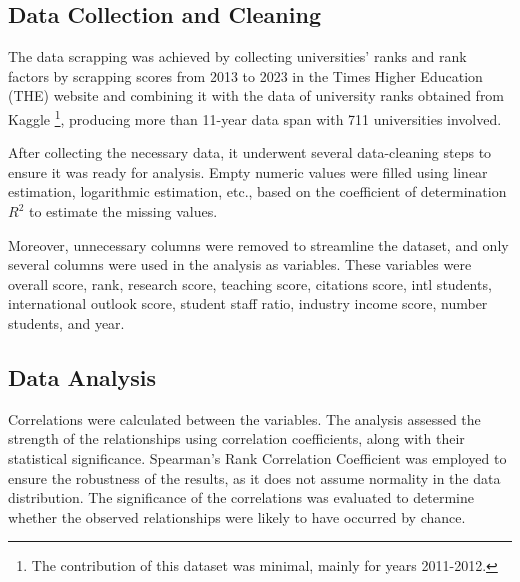 \documentclass[conference]{IEEEtran}
\begin{document}
\subsection{Data Collection and Cleaning}

The data scrapping was achieved by collecting universities' ranks and rank factors by scrapping scores from 2013 to 2023 in the Times Higher Education (THE) website \cite{the2024} and combining it with the data of university ranks obtained from Kaggle \cite{ONeil_2020}\footnote{The contribution of this dataset was minimal, mainly for years 2011-2012.}, producing more than 11-year data span with 711 universities involved. 

After collecting the necessary data, it underwent several data-cleaning steps to ensure it was ready for analysis. Empty numeric values were filled using linear estimation, logarithmic estimation, etc., based on the coefficient of determination $R^{2}$ to estimate the missing values. 

Moreover, unnecessary columns were removed to streamline the dataset, and only several columns were used in the analysis as variables. These variables were overall score, rank, research score, teaching score, citations score, intl students, international outlook score, student staff ratio, industry income score, number students, and year. 

\subsection{Data Analysis}

Correlations were calculated between the variables. The analysis assessed the strength of the relationships using correlation coefficients, along with their statistical significance. Spearman's Rank Correlation Coefficient \cite{spearman1904general} was employed to ensure the robustness of the results, as it does not assume normality in the data distribution. The significance of the correlations was evaluated to determine whether the observed relationships were likely to have occurred by chance. 

\end{document}
